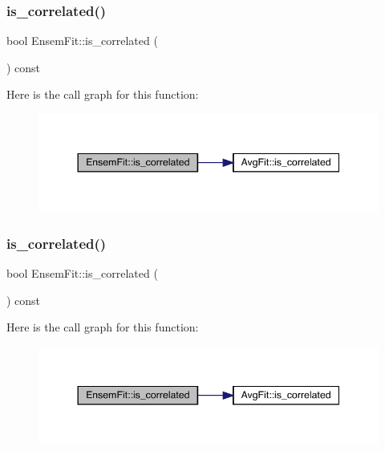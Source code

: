\subsubsection{\texorpdfstring{is\_correlated()}{is\_correlated()}\hspace{0.1cm}{\footnotesize\ttfamily [1/2]}}
{\footnotesize\ttfamily bool Ensem\+Fit\+::is\+\_\+correlated (\begin{DoxyParamCaption}{ }\end{DoxyParamCaption}) const\hspace{0.3cm}{\ttfamily [inline]}}

Here is the call graph for this function\+:
\nopagebreak
\begin{figure}[H]
\begin{center}
\leavevmode
\includegraphics[width=344pt]{dc/dae/classEnsemFit_a1abab16ecba6b2a75d6d570585d35e9a_cgraph}
\end{center}
\end{figure}
\mbox{\label{classEnsemFit_a1abab16ecba6b2a75d6d570585d35e9a}} 
\subsubsection{\texorpdfstring{is\_correlated()}{is\_correlated()}\hspace{0.1cm}{\footnotesize\ttfamily [2/2]}}
{\footnotesize\ttfamily bool Ensem\+Fit\+::is\+\_\+correlated (\begin{DoxyParamCaption}{ }\end{DoxyParamCaption}) const\hspace{0.3cm}{\ttfamily [inline]}}

Here is the call graph for this function\+:
\nopagebreak
\begin{figure}[H]
\begin{center}
\leavevmode
\includegraphics[width=344pt]{dc/dae/classEnsemFit_a1abab16ecba6b2a75d6d570585d35e9a_cgraph}
\end{center}
\end{figure}
\mbox{\label{classEnsemFit_a5f154286b15fe9dbfe74fd5e00b4ed11}} 
